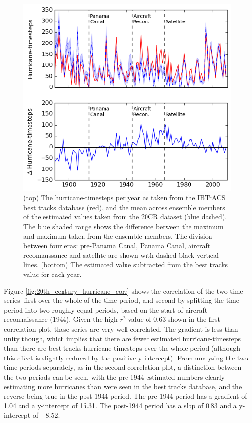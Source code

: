 \documentclass[pdftex,12pt,a4paper]{report}
\begin{document}
\begin{figure}[ht!]
    \centering
    \includegraphics[width=\textwidth]{figures/20th_century_hurricane_timesteps}
    \caption{(top) The hurricane-timesteps per year as taken from the IBTrACS best tracks database
        (red), and the mean across ensemble members of the estimated values taken from the 20CR
        dataset (blue dashed). The blue shaded range shows the difference between the maximum and maximum
        taken from the ensemble members. The division between four eras: pre-Panama Canal, Panama
        Canal, aircraft reconnaissance and satellite are shown with dashed black vertical lines.
        (bottom) The estimated value subtracted from the best tracks value for each year. 
    }
    \label{fig:20th_century_hurricane_timesteps}
\end{figure}

\newpage
Figure \ref{fig:20th_century_hurricane_corr} shows the correlation of the two time series, first
over the whole of the time period, and second by splitting the time period into two roughly equal
periods, based on the start of aircraft reconnaissance (1944). Given the high $r^2$ value of
\SI{0.63}{} shown in the first correlation plot, these series are very well correlated. The gradient
is less than unity though, which implies that there are fewer estimated hurricane-timesteps than
there are best tracks hurricane-timesteps over the whole period (although this effect is slightly
reduced by the positive y-intercept). From analysing the two time periods separately, as in the
second correlation plot, a distinction between the two periods can be seen, with the pre-1944
estimated numbers clearly estimating more hurricanes than were seen in the best tracks database, and
the reverse being true in the post-1944 period. The pre-1944 period has a gradient of \SI{1.04}{}
and a y-intercept of \SI{15.31}{}. The post-1944 period has a slop of \SI{0.83}{} and a y-intercept
of \SI{-8.52}{}.
\end{document}
